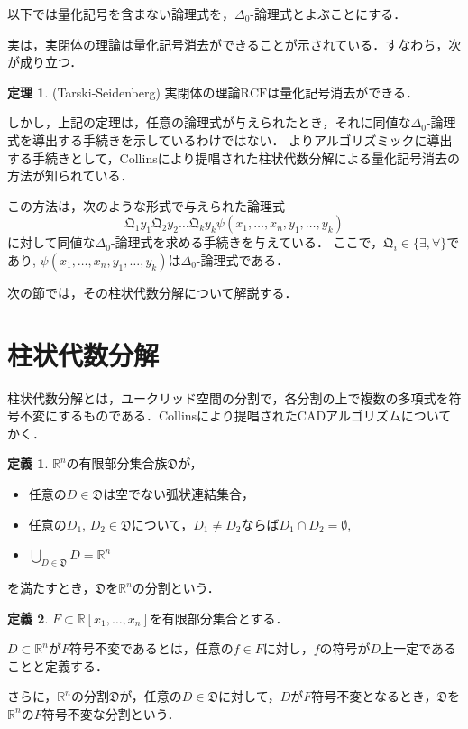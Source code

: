 \documentclass[uplatex, dvipdfmx]{jsarticle}
\newcommand{\R}{\mathbb{R}}
\newcommand{\Qua}{\mathfrak{Q}}
\newcommand{\RCF}{\mathrm{RCF}}
\theoremstyle{definition}
\newtheorem{definition}{定義}[section]
\newtheorem{theorem}{定理}[section]
\begin{document}
以下では量化記号を含まない論理式を，$\Delta_0$-論理式とよぶことにする．

実は，実閉体の理論は量化記号消去ができることが示されている．すなわち，次が成り立つ．

\begin{theorem}(Tarski-Seidenberg)
     実閉体の理論$\RCF$は量化記号消去ができる．
\end{theorem}

しかし，上記の定理は，任意の論理式が与えられたとき，それに同値な$\Delta_0$-論理式を導出する手続きを示しているわけではない．
よりアルゴリズミックに導出する手続きとして，Collinsにより提唱された柱状代数分解による量化記号消去の方法が知られている．

この方法は，次のような形式で与えられた論理式
\begin{equation*}
     \Qua_1 y_1 \Qua_2 y_2 \dots \Qua_k y_k \psi(x_1, \dots, x_n, y_1, \dots, y_k)
\end{equation*}
に対して同値な$\Delta_0$-論理式を求める手続きを与えている．
ここで，$\Qua_i \in \{\exists, \forall\}$であり, $\psi(x_1, \dots, x_n, y_1, \dots, y_k)$は$\Delta_0$-論理式である． 

次の節では，その柱状代数分解について解説する．


\section{柱状代数分解}

柱状代数分解とは，ユークリッド空間の分割で，各分割の上で複数の多項式を符号不変にするものである．Collinsにより提唱されたCADアルゴリズムについてかく．
\begin{definition}
$\R^n$の有限部分集合族$\mathfrak{D}$が，

\begin{itemize}
	\item 任意の$D \in \mathfrak{D}$は空でない弧状連結集合，
	\item 任意の$D_1$, $D_2 \in \mathfrak{D}$について，$D_1 \neq D_2$ならば$D_1 \cap D_2 = \emptyset$,
	\item $\bigcup_{D \in \mathfrak{D}}D = \R^n$
\end{itemize}

を満たすとき，$\mathfrak{D}$を$\R^n$の分割という．
\end{definition}

\begin{definition}
$F \subset \R[x_1, \dots, x_n]$を有限部分集合とする．

$D \subset \R^n$が$F$符号不変であるとは，任意の$f \in F$に対し，$f$の符号が$D$上一定であることと定義する．

さらに，$\R^n$の分割$\mathfrak{D}$が，任意の$D \in \mathfrak{D}$に対して，$D$が$F$符号不変となるとき，$\mathfrak{D}$を$\R^n$の$F$符号不変な分割という．
\end{definition}
\end{document}
